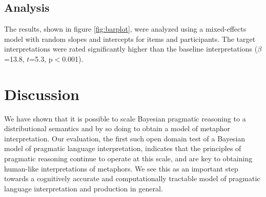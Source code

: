 \documentclass[9pt,twocolumn,twoside,lineno]{pnas-new}
\newcommand{\Listener}{L}
\newcommand{\QLONE}{\Listener_{{1}}^{{Q}}}
\begin{document}
	
	

	\subsection*{Analysis}

		The results, shown in figure \ref{fig:barplot}, were analyzed using a mixed-effects model with random slopes and intercepts for items and participants. The target interpretations were rated significantly higher than the baseline interpretations ($\beta$=13.8, $t$=5.3, p$<$0.001).



		

\section{Discussion} \label{conc} 

	We have shown that it is possible to scale Bayesian pragmatic reasoning to a distributional semantics and by so doing to obtain a model of metaphor interpretation. Our evaluation, the first such open domain test of a Bayesian model of pragmatic language interpretation, indicates that the principles of pragmatic reasoning continue to operate at this scale, and are key to obtaining human-like interpretations of metaphors. We see this as an important step towards a cognitively accurate and computationally tractable model of pragmatic language interpretation and production in general.
\end{document}
